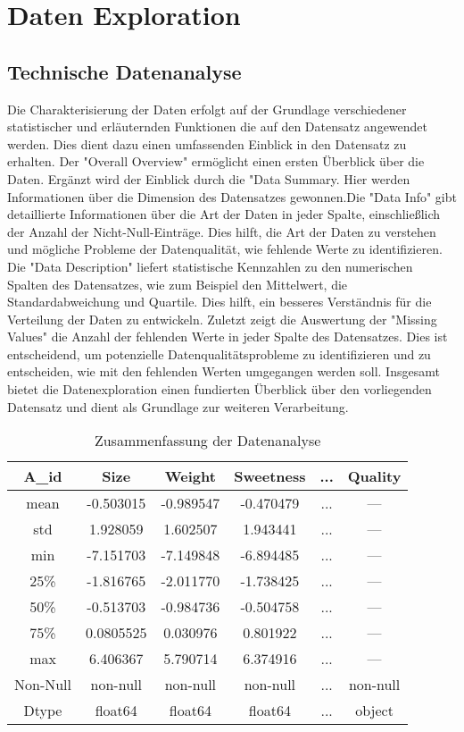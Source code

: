 \documentclass{article}
\begin{document}
\section{Daten Exploration}


\subsection{Technische Datenanalyse}
Die Charakterisierung der Daten erfolgt auf der Grundlage verschiedener statistischer und erläuternden Funktionen die auf den Datensatz angewendet werden. Dies dient dazu einen umfassenden Einblick in den Datensatz zu erhalten. Der "Overall Overview" ermöglicht einen ersten Überblick über die Daten. Ergänzt wird der Einblick durch die "Data Summary. Hier werden Informationen über die Dimension des Datensatzes gewonnen.Die "Data Info" gibt detaillierte Informationen über die Art der Daten in jeder Spalte, einschließlich der Anzahl der Nicht-Null-Einträge. Dies hilft, die Art der Daten zu verstehen und mögliche Probleme der Datenqualität, wie fehlende Werte zu identifizieren. Die "Data Description" liefert statistische Kennzahlen zu den numerischen Spalten des Datensatzes, wie zum Beispiel den Mittelwert, die Standardabweichung und Quartile. Dies hilft, ein besseres Verständnis für die
Verteilung der Daten zu entwickeln. Zuletzt zeigt die Auswertung der "Missing Values" die Anzahl der fehlenden Werte in jeder Spalte des Datensatzes. Dies ist entscheidend, um potenzielle Datenqualitätsprobleme zu identifizieren und zu entscheiden, wie mit den fehlenden Werten umgegangen werden soll. Insgesamt bietet die Datenexploration einen fundierten Überblick über den vorliegenden Datensatz und dient als Grundlage zur weiteren Verarbeitung.\\
\begin{table}[h]
\centering
\begin{tabular}{|c|c|c|c|c|c|}
\hline
\textbf{A\_id} & \textbf{Size} & \textbf{Weight} & \textbf{Sweetness} & \textbf{...} & \textbf{Quality} \\
\hline
mean & -0.503015 & -0.989547 & -0.470479 & ... & ---\\
std & 1.928059 & 1.602507 & 1.943441 & ... & --- \\
min & -7.151703 & -7.149848 & -6.894485 & ... & --- \\
25\% & -1.816765 & -2.011770 & -1.738425 & ... & --- \\
50\% & -0.513703 & -0.984736 & -0.504758 & ... & --- \\
75\% & 0.0805525 & 0.030976 & 0.801922 & ... & --- \\
max & 6.406367 & 5.790714 & 6.374916 & ... & --- \\
Non-Null & non-null & non-null & non-null & ... & non-null \\
Dtype & float64 & float64 & float64 & ... & object \\
\hline
\end{tabular}
\caption{Zusammenfassung der Datenanalyse}
\end{table}
\end{document}
